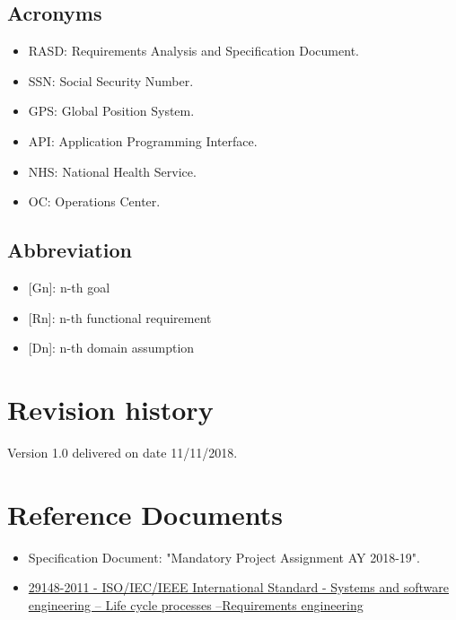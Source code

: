 \subsection{Acronyms}
\begin{itemize}
    \item RASD: Requirements Analysis and Specification Document. 
    \item SSN: Social Security Number.
    \item GPS: Global Position System.
    \item API: Application Programming Interface.
    \item NHS: National Health Service.
    \item OC: Operations Center.
\end{itemize}

\subsection{Abbreviation}
\begin{itemize}
    \item {[Gn]}: n-th goal
    \item {[Rn]}: n-th functional requirement
    \item {[Dn]}: n-th domain assumption
\end{itemize}

\section{Revision history}
Version 1.0 delivered on date 11/11/2018.

\section{Reference Documents}
\begin{itemize}
    \item Specification Document: "Mandatory Project Assignment AY 2018-19". 
    \item \href{https://ieeexplore.ieee.org/document/6146379} {29148-2011 - ISO/IEC/IEEE International Standard - Systems and software engineering -- Life cycle processes --Requirements engineering}
\end{itemize}

